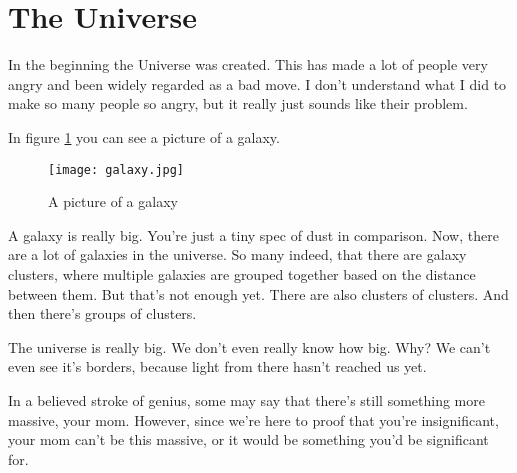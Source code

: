 \maketitle
\section*{The Universe}
In the beginning the Universe was created. This has made a lot of people very angry and been widely regarded as a bad move.
I don't understand what I did to make so many people so angry, but it really just sounds like their problem.

In figure \ref{fig:universe} you can see a picture of a galaxy.

\begin{figure}[h]
  \center
  \texttt{[image: galaxy.jpg]}
  \caption{A picture of a galaxy}
  \label{fig:universe}
\end{figure}

A galaxy is really big. You're just a tiny spec of dust in comparison. Now, there are a lot of galaxies in the universe.
So many indeed, that there are galaxy clusters, where multiple galaxies are grouped together based on the distance between them.
But that's not enough yet. There are also clusters of clusters. And then there's groups of clusters.

The universe is really big. We don't even really know how big. Why? We can't even see it's borders, because light from there hasn't reached us yet.

In a believed stroke of genius, some may say that there's still something more massive, your mom. However, since we're here to proof that you're insignificant,
your mom can't be this massive, or it would be something you'd be significant for.